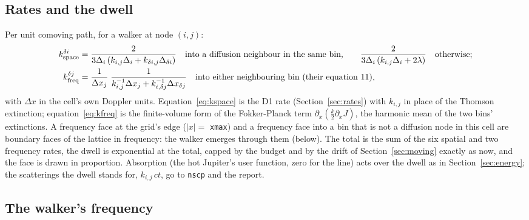 \documentclass[11pt]{article}
\newcommand{\key}[1]{\texttt{#1}}
\begin{document}
\subsection{Rates and the dwell}

Per unit comoving path, for a walker at node $(i,j)$:
\begin{align}
k^{\delta i}_{\rm space} &= \frac{2}{3\Delta_i\,(k_{i,j}\Delta_i + k_{\delta i,j}\Delta_{\delta i})}
\quad\text{into a diffusion neighbour in the same bin,}\qquad
\frac{2}{3\Delta_i\,(k_{i,j}\Delta_i + 2\lambda)}\quad\text{otherwise;}
\label{eq:kspace}\\
k^{\delta j}_{\rm freq} &= \frac{1}{\Delta x_j}\;\frac{1}{k_{i,j}^{-1}\Delta x_j + k_{i,\delta j}^{-1}\Delta x_{\delta j}}
\quad\text{into either neighbouring bin (their equation 11),}
\label{eq:kfreq}
\end{align}
with $\Delta x$ in the cell's own Doppler units.  Equation~\ref{eq:kspace} is the D1
rate (Section~\ref{sec:rates}) with $k_{i,j}$ in place of the Thomson extinction;
equation~\ref{eq:kfreq} is the finite-volume form of the Fokker-Planck term
$\partial_x(\tfrac{k}{2}\partial_x J)$, the harmonic mean of the two bins'
extinctions.  A frequency face at the grid's edge ($|x| = $ \key{xmax}) and a
frequency face into a bin that is not a diffusion node in this cell are boundary faces
of the lattice in frequency: the walker emerges through them (below).  The total is
the sum of the six spatial and two frequency rates, the dwell is exponential at the
total, capped by the budget and by the drift of Section~\ref{sec:moving} exactly as
now, and the face is drawn in proportion.  Absorption (the hot Jupiter's user
function, zero for the line) acts over the dwell as in Section~\ref{sec:energy}; the
scatterings the dwell stands for, $k_{i,j}\,ct$, go to \texttt{nscp} and the report.

\subsection{The walker's frequency}
\end{document}
